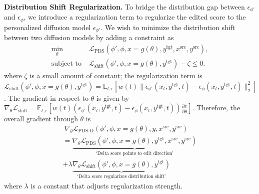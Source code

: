 \textbf{Distribution Shift Regularization.}
To bridge the distribution gap between $\epsilon_{\phi '}$ and $\epsilon_{\phi}$, we introduce a regularization term to regularize the edited score to the personalized diffusion model $\epsilon_{\phi '}$. We wish to minimize the distribution shift between two diffusion models by adding a constraint as
\begin{equation}
\begin{aligned}
\min_{\theta}\;& \mathcal{L}_{\text{PDS}}(\phi ',\phi,x=g(\theta),y^{\text{tgt}},x^{\text{src}},y^{\text{src}}),\\
\text{subject to}\;& \mathcal{L}_{\text{shift}}(\phi ',\phi,x=g(\theta),y^{\text{tgt}}) - \zeta \leq 0.
\end{aligned}
\end{equation}
where $\zeta$ is a small amount of constant; the regularization term is 
$\mathcal{L}_{\text{shift}}(\phi ',\phi,x=g(\theta), y^{\text{tgt}}) = \mathbb{E}_{t,\epsilon}[w(t) \|\epsilon_{\phi '}(x_t, y^{\text{tgt}},t) - \epsilon_{\phi}(x_t,y^{\text{tgt}},t) \|^2_2 ]$.
The gradient in respect to $\theta$ is given by
$
\nabla_\theta \mathcal{L}_{\text{shift}} =  \mathbb{E}_{t,\epsilon}[w(t)(\epsilon_{\phi '}(x_t,y^{\text{tgt}},t) - \epsilon_{\phi}(x_t,y^{\text{tgt}},t))\frac{\partial x}{\partial \theta} ]
$.
Therefore, the overall gradient through $\theta$ is 
\begin{multline}~\label{eqn:psd_0}
    \nabla_\theta \mathcal{L}_{\text{PDS-O}}(\phi ',\phi,x=g(\theta),y,x^{\text{src}},y^{\text{src}}) 
    \\ =  \underbrace{\nabla_\theta \mathcal{L}_{\text{PDS}}(\phi ',\phi,x=g(\theta),y^{\text{tgt}},x^{\text{src}},y^{\text{src}})}_{\text{`Delta score points to edit direction'}} \\
    + \lambda  \underbrace{\nabla_\theta  \mathcal{L}_{\text{shift}}(\phi ',\phi,x=g(\theta),y^{\text{tgt}})}_{\text{`Delta score regularizes distribution shift'}}
\end{multline}
where $\lambda$ is a constant that adjusts regularization strength. 

